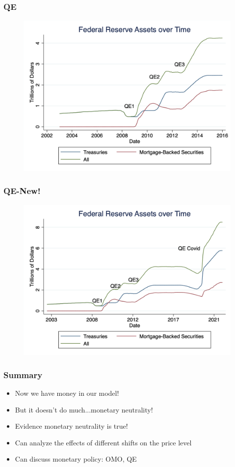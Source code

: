 \documentclass{beamer}
\begin{document}
\begin{frame}
\frametitle[alignment=center]{QE}
\begin{figure}
\centering
\includegraphics[scale=0.2]{Figures/Fig_12pt16a.png}
\end{figure}
\end{frame}

\begin{frame}
\frametitle[alignment=center]{QE-New!}
\begin{figure}
\centering
\includegraphics[scale=0.2]{Figures/Fig_12pt16b.png}
\end{figure}
\end{frame}

\begin{frame}
\frametitle[alignment=center]{Summary}
\begin{itemize}
\item Now we have money in our model!
\bigskip
\item But it doesn't do much...monetary neutrality!
\bigskip
\item Evidence monetary neutrality is true!
\bigskip
\item Can analyze the effects of different shifts on the price level
\bigskip
\item Can discuss monetary policy: OMO, QE
\end{itemize}
\end{frame}
\end{document}
